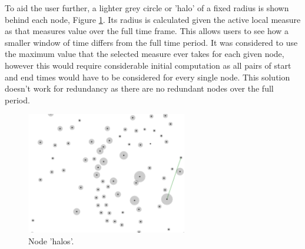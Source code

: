 To aid the user further, a lighter grey circle or 'halo' of a fixed radius is shown behind each node, Figure \ref{fig:greyCircles}. Its radius is calculated given the active local measure as that measures value over the full time frame. This allows users to see how a smaller window of time differs from the full time period. It was considered to use the maximum value that the selected measure ever takes for each given node, however this would require considerable initial computation as all pairs of start and end times would have to be considered for every single node. This solution doesn't work for redundancy as there are no redundant nodes over the full period.

\begin{figure}[h!]
  \begin{center}
  \includegraphics[trim={0, 0, 0, 0}, width=70mm]{./Figures/greyCircles.png}
  \caption{Node 'halos'.}
  \label{fig:greyCircles}
  \end{center}
\end{figure}









